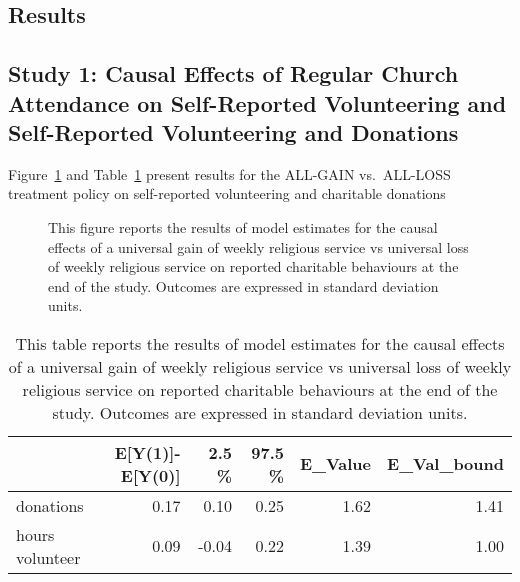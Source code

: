 \documentclass[
  singlecolumn]{article}
\begin{document}
\newpage{}

\subsection{Results}\label{results}

\subsection{Study 1: Causal Effects of Regular Church Attendance on
Self-Reported Volunteering and Self-Reported Volunteering and
Donations}\label{study-1-causal-effects-of-regular-church-attendance-on-self-reported-volunteering-and-self-reported-volunteering-and-donations}

Figure~\ref{fig-1_1} and Table~\ref{tbl-1_1} present results for the
ALL-GAIN vs.~ALL-LOSS treatment policy on self-reported volunteering and
charitable donations

\begin{figure}


\caption{\label{fig-1_1}This figure reports the results of model
estimates for the causal effects of a universal gain of weekly religious
service vs universal loss of weekly religious service on reported
charitable behaviours at the end of the study. Outcomes are expressed in
standard deviation units.}

\end{figure}%

\begin{longtable}[]{@{}lrrrrr@{}}

\caption{\label{tbl-1_1}This table reports the results of model
estimates for the causal effects of a universal gain of weekly religious
service vs universal loss of weekly religious service on reported
charitable behaviours at the end of the study. Outcomes are expressed in
standard deviation units.}

\tabularnewline

\toprule\noalign{}
& E{[}Y(1){]}-E{[}Y(0){]} & 2.5 \% & 97.5 \% & E\_Value &
E\_Val\_bound \\
\midrule\noalign{}
\endhead
\bottomrule\noalign{}
\endlastfoot
donations & 0.17 & 0.10 & 0.25 & 1.62 & 1.41 \\
hours volunteer & 0.09 & -0.04 & 0.22 & 1.39 & 1.00 \\

\end{longtable}
\end{document}
